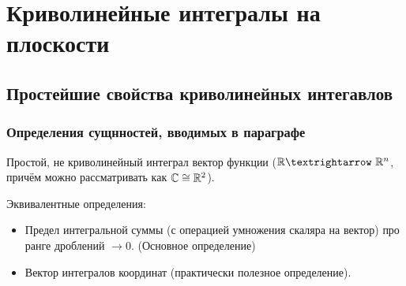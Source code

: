 \documentclass[12pt, a4paper, oneside]{memoir}
\begin{document}
\chapter{Криволинейные интегралы на плоскости}

\section{Простейшие свойства криволинейных интегавлов}

\subsection{Определения сущнностей, вводимых в параграфе}

\begin{definition}
    
    Простой, не криволинейный интеграл вектор функции ($\sR → \sR^n$, причём можно рассматривать как ${\mathbb{C}} \cong {\mathbb{R}}^2$).

    Эквивалентные определения:
    \begin{itemize}
        \item Предел интегральной суммы (с операцией умножения скаляра на вектор) про ранге дроблений $→ 0$. (Основное определение)
        \item Вектор интегралов координат (практически полезное определение).
    \end{itemize}
\end{definition}
\end{document}
